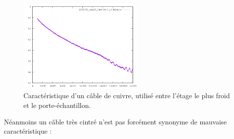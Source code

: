 \begin{figure}[h]
    \begin{center}
        \includegraphics[width=0.55\textwidth]{Images/Caracs/Cuivre.png}
        \caption{Caractéristique d'un câble de cuivre, utilisé entre l'étage le plus froid et le porte-échantillon.}
        \label{carac_cuivre}
    \end{center}
\end{figure}



\newpage
Néanmoins un câble très cintré n'est pas forcément synonyme de mauvaise caractéristique :


